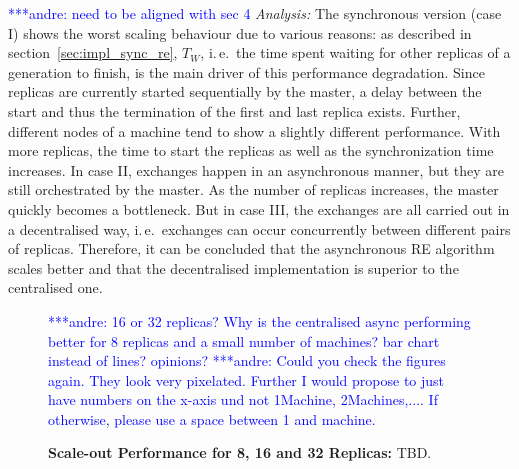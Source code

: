\documentclass{rspublic}
\newcommand{\alnote}[1]{ {\textcolor{blue} { ***andre: #1 }}}
\newcommand{\alnote}[1]{}
\begin{document}
\alnote{need to be aligned with sec 4}
{\it Analysis: } The synchronous version (case I) shows the
worst scaling behaviour due to various reasons: as described in section~\ref{sec:impl_sync_re},
$T_{W}$, i.\,e.\ the time spent waiting for other replicas of a generation to finish,
is the main driver of this performance degradation. Since replicas are currently started
sequentially by the master, a delay between the start and thus the termination of the first and 
last replica exists. Further, different nodes of a machine tend to show a slightly 
different performance. With more replicas, the time to start the replicas as well as the
synchronization time increases.  In case II, exchanges happen in
an asynchronous manner, but they are still orchestrated by the master. 
As the number of replicas increases, the master quickly becomes
a bottleneck. But in case III, the exchanges are all carried out in a
decentralised way, i.\,e.\ exchanges can occur concurrently between 
different pairs of replicas. Therefore, it can be concluded that the asynchronous
RE algorithm scales better and that the decentralised implementation
is superior to the centralised one.

%
\begin{figure}%
\centering
{}\qquad
\caption{\textbf{Scale-out Performance for 8, 16 and 32 Replicas:} 
  TBD.}
  \alnote{16 or 32 replicas? Why is the centralised async performing better for 8 replicas and a small number of machines? bar chart instead of lines? opinions?}
\alnote{Could you check the figures again. They look very pixelated. Further I would propose to just have numbers on the x-axis und not 1Machine, 2Machines,.... If otherwise, please use a space between 1 and machine.}
\label{fig:24machines}

\end{figure}
\end{document}
